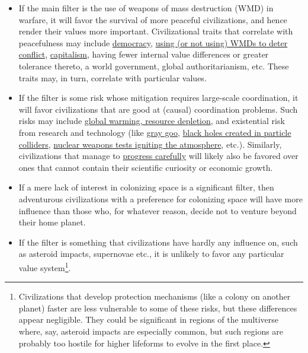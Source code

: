 \documentclass[]{article}
\begin{document}
\begin{itemize}
\item
  If the main filter is the use of weapons of mass destruction (WMD) in
  warfare, it will favor the survival of more peaceful civilizations,
  and hence render their values more important. Civilizational traits
  that correlate with peacefulness may include
  \href{https://en.wikipedia.org/wiki/Democratic_peace_theory}{democracy},
  \href{https://en.wikipedia.org/wiki/Nuclear_peace}{using (or not
  using) WMDs to deter conflict},
  \href{https://en.wikipedia.org/wiki/Capitalist_peace}{capitalism},
  having fewer internal value differences or greater tolerance thereto,
  a world government, global authoritarianism, etc. These traits may, in
  turn, correlate with particular values.
\item
  If the filter is some risk whose mitigation requires large-scale
  coordination, it will favor civilizations that are good at (causal)
  coordination problems. Such risks may include
  \href{https://en.wikipedia.org/wiki/Fermi_paradox\#Resource_depletion_and_climate_change}{global
  warming, resource depletion}, and existential risk from research and
  technology (like
  \href{https://en.wikipedia.org/wiki/Grey_goo}{gray goo},
  \href{https://en.wikipedia.org/wiki/Safety_of_high-energy_particle_collision_experiments}{black
  holes created in particle colliders},
  \href{https://fas.org/sgp/othergov/doe/lanl/docs1/00329010.pdf}{nuclear
  weapons tests igniting the atmosphere}, etc.). Similarly,
  civilizations that manage to
  \href{https://foundational-research.org/differential-intellectual-progress-as-a-positive-sum-project/}{progress
  carefully} will likely also be favored over ones that cannot contain
  their scientific curiosity or economic growth.
\item
  If a mere lack of interest in colonizing space is a significant
  filter, then adventurous civilizations with a preference for
  colonizing space will have more influence than those who, for whatever
  reason, decide not to venture beyond their home planet.
\item
  If the filter is something that civilizations have hardly any
  influence on, such as asteroid impacts, supernovae etc., it is
  unlikely to favor any particular value system\footnote{Civilizations
    that develop protection mechanisms (like a colony on another planet)
    faster are less vulnerable to some of these risks, but these
    differences appear negligible. They could be significant in regions
    of the multiverse where, say, asteroid impacts are especially
    common, but such regions are probably too hostile for higher
    lifeforms to evolve in the first place.}.
\end{itemize}
\end{document}
